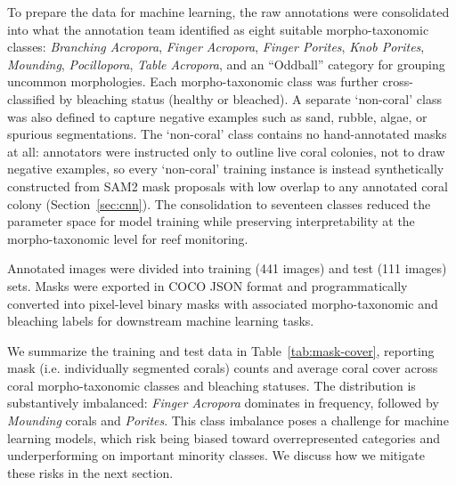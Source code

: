 \documentclass[11pt]{elsarticle}
\begin{document}
To prepare the data for machine learning, the raw annotations were consolidated into what the annotation team identified as eight suitable morpho-taxonomic classes: \emph{Branching Acropora}, \emph{Finger Acropora}, \emph{Finger Porites}, \emph{Knob Porites}, \emph{Mounding}, \emph{Pocillopora}, \emph{Table Acropora}, and an ``Oddball'' category for grouping uncommon morphologies. Each morpho-taxonomic class was further cross-classified by bleaching status (healthy or bleached). A separate `non-coral' class was also defined to capture negative examples such as sand, rubble, algae, or spurious segmentations. The `non-coral' class contains no hand-annotated masks at all: annotators were instructed only to outline live coral colonies, not to draw negative examples, so every `non-coral' training instance is instead synthetically constructed from SAM2 mask proposals with low overlap to any annotated coral colony (Section~\ref{sec:cnn}). The consolidation to seventeen classes reduced the parameter space for model training while preserving interpretability at the morpho-taxonomic level for reef monitoring.

Annotated images were divided into training (441 images) and test (111 images) sets. Masks were exported in COCO JSON format and programmatically converted into pixel-level binary masks with associated morpho-taxonomic and bleaching labels for downstream machine learning tasks.

We summarize the training and test data in Table~\ref{tab:mask-cover}, reporting mask (i.e. individually segmented corals) counts and average coral cover across coral morpho-taxonomic classes and bleaching statuses. The distribution is substantively imbalanced: \emph{Finger Acropora} dominates in frequency, followed by \emph{Mounding} corals and \textit{Porites}. This class imbalance poses a challenge for machine learning models, which risk being biased toward overrepresented categories and underperforming on important minority classes. We discuss how we mitigate these risks in the next section.
\end{document}
